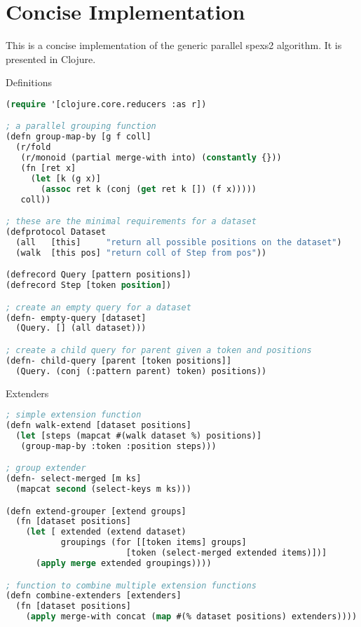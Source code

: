 \chapter{Concise Implementation}
\label{add:concise}

This is a concise implementation of the generic parallel spexs2 algorithm. It is presented in Clojure\cite{clojure}.

\begin{algorithm}[H]
  \caption{Definitions}
\begin{lstlisting}[language=Lisp]
(require '[clojure.core.reducers :as r])

; a parallel grouping function
(defn group-map-by [g f coll]
  (r/fold 
   (r/monoid (partial merge-with into) (constantly {}))
   (fn [ret x]
     (let [k (g x)]
       (assoc ret k (conj (get ret k []) (f x)))))
   coll))

; these are the minimal requirements for a dataset
(defprotocol Dataset
  (all   [this]     "return all possible positions on the dataset")
  (walk  [this pos] "return coll of Step from pos"))

(defrecord Query [pattern positions])
(defrecord Step [token position])

; create an empty query for a dataset
(defn- empty-query [dataset]
  (Query. [] (all dataset)))

; create a child query for parent given a token and positions
(defn- child-query [parent [token positions]]
  (Query. (conj (:pattern parent) token) positions))
\end{lstlisting}
\end{algorithm}

\begin{algorithm}[H]
  \caption{Extenders}
\begin{lstlisting}[language=Lisp]
; simple extension function
(defn walk-extend [dataset positions]
  (let [steps (mapcat #(walk dataset %) positions)]
   (group-map-by :token :position steps)))

; group extender
(defn- select-merged [m ks]
  (mapcat second (select-keys m ks)))

(defn extend-grouper [extend groups]
  (fn [dataset positions]
    (let [ extended (extend dataset)
           groupings (for [[token items] groups] 
                        [token (select-merged extended items)])]
      (apply merge extended groupings))))

; function to combine multiple extension functions
(defn combine-extenders [extenders]
  (fn [dataset positions] 
    (apply merge-with concat (map #(% dataset positions) extenders))))
\end{lstlisting}
\end{algorithm}

